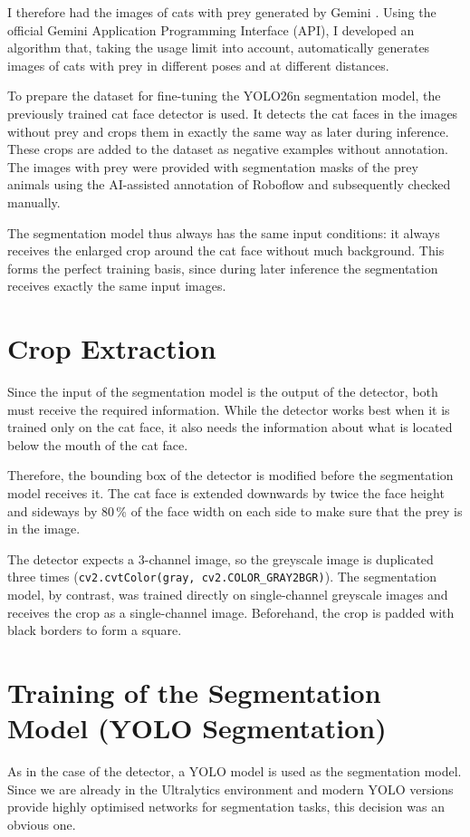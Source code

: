 I therefore had the images of cats with prey generated by Gemini \cite{geminiteam2023gemini}. Using the official Gemini Application Programming Interface (API), I developed an algorithm that, taking the usage limit into account, automatically generates images of cats with prey in different poses and at different distances.

To prepare the dataset for fine-tuning the YOLO26n segmentation model, the previously trained cat face detector is used. It detects the cat faces in the images without prey and crops them in exactly the same way as later during inference. These crops are added to the dataset as negative examples without annotation. The images with prey were provided with segmentation masks of the prey animals using the AI-assisted annotation of Roboflow \cite{roboflow2025} and subsequently checked manually.

The segmentation model thus always has the same input conditions: it always receives the enlarged crop around the cat face without much background. This forms the perfect training basis, since during later inference the segmentation receives exactly the same input images.

\section{Crop Extraction}
Since the input of the segmentation model is the output of the detector, both must receive the required information. While the detector works best when it is trained only on the cat face, it also needs the information about what is located below the mouth of the cat face.

Therefore, the bounding box of the detector is modified before the segmentation model receives it. The cat face is extended downwards by twice the face height and sideways by 80\,\% of the face width on each side to make sure that the prey is in the image.

The detector expects a 3-channel image, so the greyscale image is duplicated three times (\texttt{cv2.cvtColor(gray, cv2.COLOR\_GRAY2BGR)}). The segmentation model, by contrast, was trained directly on single-channel greyscale images and receives the crop as a single-channel image. Beforehand, the crop is padded with black borders to form a square.

\section{Training of the Segmentation Model (YOLO Segmentation)}
As in the case of the detector, a YOLO model is used as the segmentation model. Since we are already in the Ultralytics environment and modern YOLO versions provide highly optimised networks for segmentation tasks, this decision was an obvious one.

